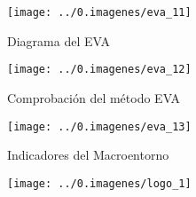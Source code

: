 \begin{leftcolumn}

\begin{figure}[H]
\centering
\caption{Diagrama del EVA}\vspace{5pt}
\texttt{[image: ../0.imagenes/eva\_11]}
\end{figure}

\begin{figure}[H]
\centering
\caption{Comprobación del método EVA}\vspace{5pt}
\texttt{[image: ../0.imagenes/eva\_12]}
\end{figure}

\begin{figure}[H]
\centering
\caption{Indicadores del Macroentorno }
\texttt{[image: ../0.imagenes/eva\_13]}
\end{figure}

\begin{figure}[H]
\centering
\texttt{[image: ../0.imagenes/logo\_1]}
\end{figure}



\end{leftcolumn}